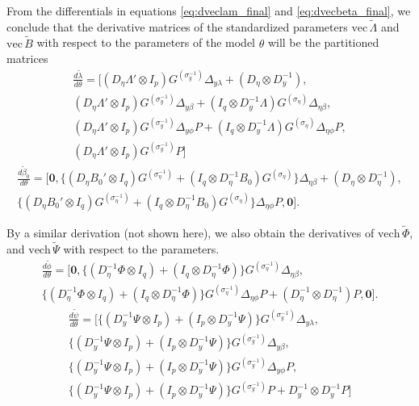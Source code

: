 \documentclass[a4paper,11pt]{article}
\newcommand{\n}{\eta}
\renewcommand{\l}{\lambda}
\renewcommand{\b}{\beta}
\newcommand{\p}{\phi}
\newcommand{\kronprod}{\otimes}
\renewcommand{\vec}{\mathrm{vec}\,}
\newcommand{\vech}{\mathrm{vech}\,}
\newcommand{\Lambdastan}{\tilde{\Lambda}}
\newcommand{\Bstan}{\tilde{B}}
\newcommand{\Phistan}{\tilde{\Phi}}
\newcommand{\Psistan}{\tilde{\Psi}}
\newcommand{\0}{\boldsymbol{0}}
\begin{document}
From the differentials in equations \ref{eq:dveclam_final} and
\ref{eq:dvecbeta_final},
we conclude that the derivative matrices  of the standardized parameters 
$\vec \Lambdastan$ and $\vec \Bstan$  with respect to the  
parameters of the model $\theta$ will be the partitioned matrices
\begin{multline}\label{eq:dlambda}
\frac{d \tilde\l}{d \theta} = [
        (D_\n \Lambda' \kronprod I_p) G^{(\sigma^{-1}_y)} \Delta_{y\l} + 
            (D_\n \kronprod D_y^{-1}), \\
        (D_\n \Lambda' \kronprod I_p) G^{(\sigma^{-1}_y)} \Delta_{y\b} + 
            (I_q \kronprod D_y^{-1}\Lambda) G^{(\sigma_\n)} \Delta_{\n\b},\\
(D_\n \Lambda' \kronprod I_p) G^{(\sigma^{-1}_y)} \Delta_{y\phi} P +
         (I_q \kronprod D_y^{-1}\Lambda) G^{(\sigma_\n)} \Delta_{\n\p} P, \\            
        (D_\n \Lambda' \kronprod I_p) G^{(\sigma^{-1}_y)}  P
 ] 
\end{multline}
\begin{multline}\label{eq:dbeta}
\frac{d \tilde\b_0}{d \theta} = [
        \0,
         \{(D_\n B_0' \kronprod I_q) G^{(\sigma^{-1}_\n)}  + 
            (I_q \kronprod D_\n^{-1}B_0) G^{(\sigma_\n)} \} \Delta_{\n\b} +
            (D_\n \kronprod D_\n^{-1})
            ,\\
         \{(D_\n B_0' \kronprod I_q) G^{(\sigma^{-1}_\n)}  + 
            (I_q \kronprod D_\n^{-1}B_0) G^{(\sigma_\n)} \} \Delta_{\n\p} P
            ,  
        \0
 ] .
\end{multline}

By a similar derivation (not shown here), we also obtain the derivatives of $\vech \Phistan$, and $\vech \Psistan$
with respect to the parameters.
\begin{multline}\label{eq:dphi}
\frac{d \tilde{\phi}}{d \theta} = [
\0,
      \{ (D^{-1}_\n \Phi \kronprod I_q)  + (I_q \kronprod D_\n^{-1}\Phi)  \} G^{(\sigma^{-1}_\n)} \Delta_{\n\b}        
     ,\\
      \{(D^{-1}_\n \Phi \kronprod I_q)  + (I_q \kronprod D_\n^{-1}\Phi)  \}  G^{(\sigma^{-1}_\n)} \Delta_{\n\p}  P +   
      	 (D_\n^{-1} \kronprod D_\n^{-1}) P
              ,
        \0
 ] .
\end{multline}
\newcommand{\F}{\{(D^{-1}_y \Psi \kronprod I_p)  + (I_p \kronprod D_y^{-1}\Psi)  \}  G^{(\sigma^{-1}_y)}}
\begin{multline}\label{eq:dpsi}
\frac{d \tilde{\psi}}{d \theta} = [
\F   \Delta_{y\l}  ,\\
\F   \Delta_{y\b}         ,\\
\F   \Delta_{y\phi}   P       ,\\
 \F P  + D^{-1}_y \kronprod D^{-1}_y P
   ]
\end{multline}
\end{document}
